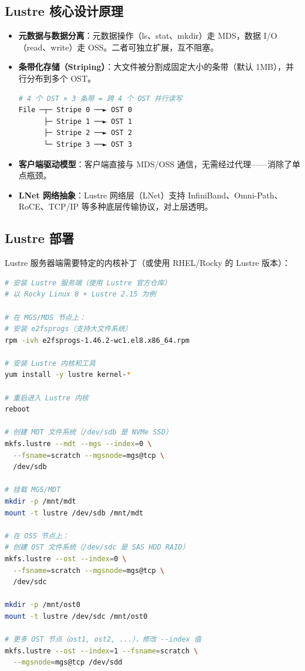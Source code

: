 \documentclass[12pt,UTF8]{ctexbook}
\begin{document}
\subsection{Lustre 核心设计原理}

\begin{itemize}
    \item \textbf{元数据与数据分离}：元数据操作（ls、stat、mkdir）走 MDS，数据 I/O（read、write）走 OSS。二者可独立扩展，互不阻塞。
    \item \textbf{条带化存储（Striping）}：大文件被分割成固定大小的条带（默认 1MB），并行分布到多个 OST。
    \begin{lstlisting}[language=bash]
# 4 个 OST × 3 条带 = 跨 4 个 OST 并行读写
File ─┬─ Stripe 0 ──► OST 0
      ├─ Stripe 1 ──► OST 1
      ├─ Stripe 2 ──► OST 2
      └─ Stripe 3 ──► OST 3
    \end{lstlisting}
    \item \textbf{客户端驱动模型}：客户端直接与 MDS/OSS 通信，无需经过代理——消除了单点瓶颈。
    \item \textbf{LNet 网络抽象}：Lustre 网络层（LNet）支持 InfiniBand、Omni-Path、RoCE、TCP/IP 等多种底层传输协议，对上层透明。
\end{itemize}

\subsection{Lustre 部署}

Lustre 服务器端需要特定的内核补丁（或使用 RHEL/Rocky 的 Lustre 版本）：

\begin{lstlisting}[language=bash]
# 安装 Lustre 服务端（使用 Lustre 官方仓库）
# 以 Rocky Linux 8 + Lustre 2.15 为例

# 在 MGS/MDS 节点上：
# 安装 e2fsprogs（支持大文件系统）
rpm -ivh e2fsprogs-1.46.2-wc1.el8.x86_64.rpm

# 安装 Lustre 内核和工具
yum install -y lustre kernel-*

# 重启进入 Lustre 内核
reboot

# 创建 MDT 文件系统（/dev/sdb 是 NVMe SSD）
mkfs.lustre --mdt --mgs --index=0 \
  --fsname=scratch --mgsnode=mgs@tcp \
  /dev/sdb

# 挂载 MGS/MDT
mkdir -p /mnt/mdt
mount -t lustre /dev/sdb /mnt/mdt

# 在 OSS 节点上：
# 创建 OST 文件系统（/dev/sdc 是 SAS HDD RAID）
mkfs.lustre --ost --index=0 \
  --fsname=scratch --mgsnode=mgs@tcp \
  /dev/sdc

mkdir -p /mnt/ost0
mount -t lustre /dev/sdc /mnt/ost0

# 更多 OST 节点（ost1, ost2, ...），修改 --index 值
mkfs.lustre --ost --index=1 --fsname=scratch \
  --mgsnode=mgs@tcp /dev/sdd
\end{lstlisting}
\end{document}
